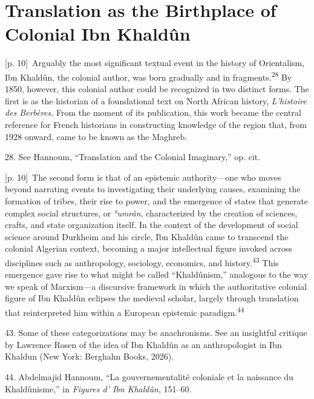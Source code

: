 \documentclass[10pt,a4paper]{article}
\begin{document}
\section*{Translation as the Birthplace of Colonial Ibn Khaldûn}
{\scriptsize\color{gray} [p. 10]}\ Arguably the most significant textual event in the history of Orientalism, Ibn Khaldûn, the colonial author, was born gradually and in fragments.\nobreak\textsuperscript{28} By 1850, however, this colonial author could be recognized in two distinct forms. The first is as the historian of a foundational text on North African history, \textit{L’histoire des Berbères.} From the moment of its publication, this work became the central reference for French historians in constructing knowledge of the region that, from 1928 onward, came to be known as the Maghreb.\par{\small 28. See Hannoum, “Translation and the Colonial Imaginary,” op. cit.\par}
{\scriptsize\color{gray} [p. 10]}\ The second form is that of an epistemic authority—one who moves beyond narrating events to investigating their underlying causes, examining the formation of tribes, their rise to power, and the emergence of states that generate complex social structures, or \textit{ʿumrân}, characterized by the creation of sciences, crafts, and state organization itself. In the context of the development of social science around Durkheim and his circle, Ibn Khaldûn came to transcend the colonial Algerian context, becoming a major intellectual figure invoked across disciplines such as anthropology, sociology, economics, and history.\nobreak\textsuperscript{43} This emergence gave rise to what might be called “Khaldûnism,” analogous to the way we speak of Marxism—a discursive framework in which the authoritative colonial figure of Ibn Khaldûn eclipses the medieval scholar, largely through translation that reinterpreted him within a European epistemic paradigm.\nobreak\textsuperscript{44}\par{\small 43. Some of these categorizations may be anachronisms. See an insightful critique by Lawrence Rosen of the idea of Ibn Khaldûn as an anthropologist in Ibn Khaldun (New York: Berghahn Books, 2026).\par}{\small 44. Abdelmajid Hannoum, “La gouvernementalité coloniale et la naissance du Khaldûnisme,” in \textit{Figures d’ Ibn Khaldûn}, 151–60.\par}
\end{document}
